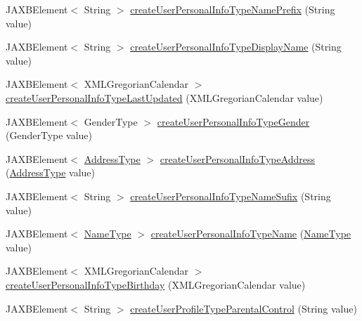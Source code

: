 \begin{DoxyCompactItemize}
\item 
JAXBElement$<$ String $>$ \hyperlink{classcom_1_1telefonica_1_1schemas_1_1unica_1_1rest_1_1directory_1_1v1_1_1ObjectFactory_ac9c5f5255cef2ab4a5c8bf0d5661386b}{createUserPersonalInfoTypeNamePrefix} (String value)
\item 
JAXBElement$<$ String $>$ \hyperlink{classcom_1_1telefonica_1_1schemas_1_1unica_1_1rest_1_1directory_1_1v1_1_1ObjectFactory_ad47c430d0bf1f05df17fdb3c6619096e}{createUserPersonalInfoTypeDisplayName} (String value)
\item 
JAXBElement$<$ XMLGregorianCalendar $>$ \hyperlink{classcom_1_1telefonica_1_1schemas_1_1unica_1_1rest_1_1directory_1_1v1_1_1ObjectFactory_a34584434e5d0abb2611133d18d7a4c1d}{createUserPersonalInfoTypeLastUpdated} (XMLGregorianCalendar value)
\item 
JAXBElement$<$ GenderType $>$ \hyperlink{classcom_1_1telefonica_1_1schemas_1_1unica_1_1rest_1_1directory_1_1v1_1_1ObjectFactory_a150fc5bda2bcd22b52b43317d9f536e4}{createUserPersonalInfoTypeGender} (GenderType value)
\item 
JAXBElement$<$ \hyperlink{classcom_1_1telefonica_1_1schemas_1_1unica_1_1rest_1_1common_1_1v1_1_1AddressType}{AddressType} $>$ \hyperlink{classcom_1_1telefonica_1_1schemas_1_1unica_1_1rest_1_1directory_1_1v1_1_1ObjectFactory_ae234771e790aff6eb519a1d27f34d619}{createUserPersonalInfoTypeAddress} (\hyperlink{classcom_1_1telefonica_1_1schemas_1_1unica_1_1rest_1_1common_1_1v1_1_1AddressType}{AddressType} value)
\item 
JAXBElement$<$ String $>$ \hyperlink{classcom_1_1telefonica_1_1schemas_1_1unica_1_1rest_1_1directory_1_1v1_1_1ObjectFactory_a23b7c718cd328a276f7ead22d1d7a5f8}{createUserPersonalInfoTypeNameSufix} (String value)
\item 
JAXBElement$<$ \hyperlink{classcom_1_1telefonica_1_1schemas_1_1unica_1_1rest_1_1directory_1_1v1_1_1NameType}{NameType} $>$ \hyperlink{classcom_1_1telefonica_1_1schemas_1_1unica_1_1rest_1_1directory_1_1v1_1_1ObjectFactory_a7313963b96c9bc0f9e8525e5dd39c3fe}{createUserPersonalInfoTypeName} (\hyperlink{classcom_1_1telefonica_1_1schemas_1_1unica_1_1rest_1_1directory_1_1v1_1_1NameType}{NameType} value)
\item 
JAXBElement$<$ XMLGregorianCalendar $>$ \hyperlink{classcom_1_1telefonica_1_1schemas_1_1unica_1_1rest_1_1directory_1_1v1_1_1ObjectFactory_ac426ea74a4ed920175dd2dbf23597f1a}{createUserPersonalInfoTypeBirthday} (XMLGregorianCalendar value)
\item 
JAXBElement$<$ String $>$ \hyperlink{classcom_1_1telefonica_1_1schemas_1_1unica_1_1rest_1_1directory_1_1v1_1_1ObjectFactory_aeaa9c7ef5f595b90f0be20a497e10574}{createUserProfileTypeParentalControl} (String value)

\end{DoxyCompactItemize}

